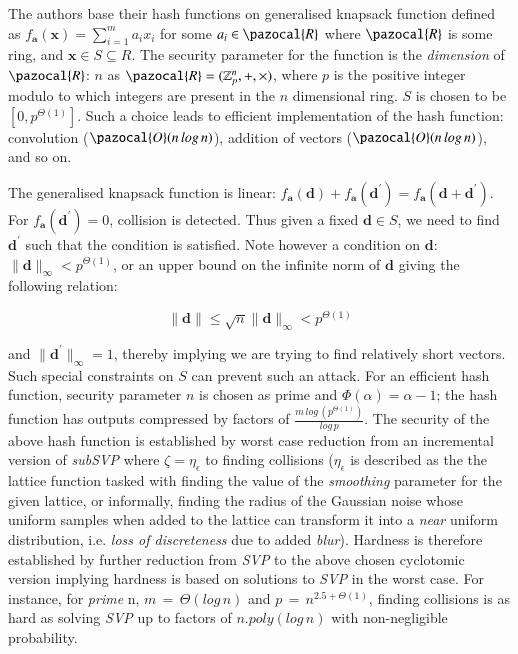 \documentclass[10pt]{elsarticle}
\begin{document}
The authors base their hash functions on generalised knapsack function defined as $f_{\mathbf{a}}(\mathbf{x}) = \sum_{i = 1}^{m} a_{i}x_{i}$ for some $a_{i} \in \pazocal{R}$ where $\pazocal{R}$ is some ring, and $\mathbf{x} \in S \subseteq R$. The security parameter for the function is the \textit{dimension} of $\pazocal{R}$: $n$ as $\pazocal{R} = (\mathbb{Z}^{n}_{p}, +, \times)$, where $p$ is the positive integer modulo to which integers are present in the $n$ dimensional ring. $S$ is chosen to be $[0, p^{\Theta(1)}]$. Such a choice leads to efficient implementation of the hash function: convolution ($\pazocal{O}(n\,log\,n)$), addition of vectors ($\pazocal{O}(n\,log\,n)$), and so on.

The generalised knapsack function is linear:
$f_{\mathbf{a}}(\mathbf{d}) + f_{\mathbf{a}}(\mathbf{d}^{\prime}) =
f_{\mathbf{a}}(\mathbf{d} + \mathbf{d}^{\prime})$. For
$f_{\mathbf{a}}(\mathbf{d}^{\prime}) = 0$, collision is detected.
Thus given a fixed $\mathbf{d} \in S$, we need to find
$\mathbf{d}^{\prime}$ such that the condition is satisfied. Note
however a condition on $\mathbf{d}$: $\parallel \mathbf{d}
\parallel_{\infty} < p^{\Theta(1)}$, or an upper bound on the
infinite norm of $\mathbf{d}$ giving the following relation:

$$\parallel \mathbf{d} \parallel \leq \sqrt{n} \parallel \mathbf{d} \parallel_{\infty} <  p^{\Theta(1)}$$

and $\parallel \mathbf{d}^{\prime}\parallel_{\infty} = 1$, thereby
implying we are trying to find relatively short vectors. Such
special constraints on $S$ can prevent such an attack. For an
efficient hash function, security parameter $n$ is chosen as prime
and $\Phi(\alpha) = \alpha - 1$; the hash function has outputs
compressed by factors of $\frac{m\, log\, (p^{\Theta(1)})}{log\,
p}$. The security of the above hash function is established by worst
case reduction from an incremental version of \textit{subSVP} where
$\zeta = \eta_{\epsilon}$ to finding collisions ($\eta_{\epsilon}$
is described as the the lattice function tasked with finding the
value of the \textit{smoothing} parameter for the given lattice, or
informally, finding the radius of the Gaussian noise whose uniform
samples when added to the lattice can transform it into a
\textit{near} uniform distribution, i.e. \textit{loss of
discreteness} due to added \textit{blur}). Hardness is therefore
established by further reduction from \textit{SVP} to the above
chosen cyclotomic version implying hardness is based on solutions to
\textit{SVP} in the worst case. For instance, for \textit{prime} n,
$m\,=\,\Theta(log\,n)$ and $p\,=\,n^{2.5 + \Theta(1)}$, finding
collisions is as hard as solving \textit{SVP} up to factors of
$n.poly(log\,n)$ with non-negligible probability.
\end{document}
